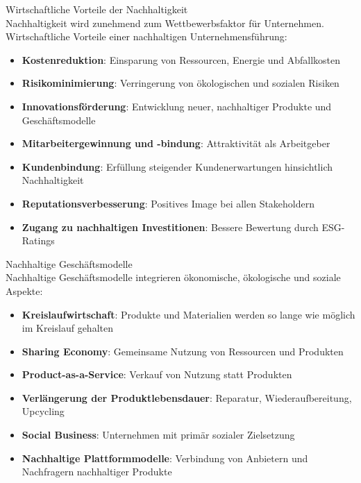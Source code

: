 \begin{concept}{Wirtschaftliche Vorteile der Nachhaltigkeit}\\
Nachhaltigkeit wird zunehmend zum Wettbewerbsfaktor für Unternehmen. Wirtschaftliche Vorteile einer nachhaltigen Unternehmensführung:
\begin{itemize}
    \item \textbf{Kostenreduktion}: Einsparung von Ressourcen, Energie und Abfallkosten
    \item \textbf{Risikominimierung}: Verringerung von ökologischen und sozialen Risiken
    \item \textbf{Innovationsförderung}: Entwicklung neuer, nachhaltiger Produkte und Geschäftsmodelle
    \item \textbf{Mitarbeitergewinnung und -bindung}: Attraktivität als Arbeitgeber
    \item \textbf{Kundenbindung}: Erfüllung steigender Kundenerwartungen hinsichtlich Nachhaltigkeit
    \item \textbf{Reputationsverbesserung}: Positives Image bei allen Stakeholdern
    \item \textbf{Zugang zu nachhaltigen Investitionen}: Bessere Bewertung durch ESG-Ratings
\end{itemize}
\end{concept}

\begin{concept}{Nachhaltige Geschäftsmodelle}\\
Nachhaltige Geschäftsmodelle integrieren ökonomische, ökologische und soziale Aspekte:
\begin{itemize}
    \item \textbf{Kreislaufwirtschaft}: Produkte und Materialien werden so lange wie möglich im Kreislauf gehalten
    \item \textbf{Sharing Economy}: Gemeinsame Nutzung von Ressourcen und Produkten
    \item \textbf{Product-as-a-Service}: Verkauf von Nutzung statt Produkten
    \item \textbf{Verlängerung der Produktlebensdauer}: Reparatur, Wiederaufbereitung, Upcycling
    \item \textbf{Social Business}: Unternehmen mit primär sozialer Zielsetzung
    \item \textbf{Nachhaltige Plattformmodelle}: Verbindung von Anbietern und Nachfragern nachhaltiger Produkte
\end{itemize}
\end{concept}

